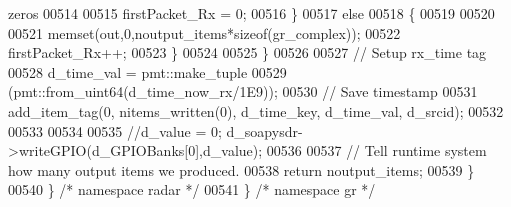 \begin{DoxyCode}
{       zeros}
00514 
00515           firstPacket_Rx = 0;
00516         \}
00517         \textcolor{keywordflow}{else}
00518         \{
00519 
00520 
00521           memset(out,0,noutput\_items*\textcolor{keyword}{sizeof}(gr\_complex));
00522           firstPacket_Rx++;
00523         \}
00524 
00525       \}
00526 
00527       \textcolor{comment}{// Setup rx\_time tag}
00528       d_time_val = pmt::make\_tuple
00529       (pmt::from\_uint64(d_time_now_rx/1E9));
00530       \textcolor{comment}{// Save timestamp}
00531       add\_item\_tag(0, nitems\_written(0), d_time_key, d_time_val, d_srcid);
00532 
00533 
00534 
00535       \textcolor{comment}{//d\_value = 0; d\_soapysdr->writeGPIO(d\_GPIOBanks[0],d\_value);}
00536 
00537       \textcolor{comment}{// Tell runtime system how many output items we produced.}
00538       \textcolor{keywordflow}{return} noutput\_items;
00539     \}
00540   \} \textcolor{comment}{/* namespace radar */}
00541 \} \textcolor{comment}{/* namespace gr */}
\end{DoxyCode}
